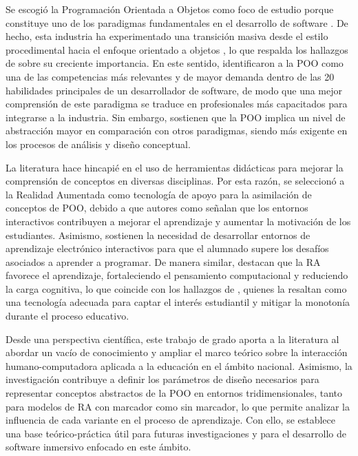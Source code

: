 Se escogió la Programación Orientada a Objetos como foco de estudio porque 
constituye uno de los paradigmas fundamentales en el desarrollo de software 
\parencite{Onu2024}. De hecho, esta industria ha experimentado una transición 
masiva desde el estilo procedimental hacia el enfoque orientado a objetos 
\parencite{Agu2022}, lo que respalda los hallazgos de \textcite{Surakka2007} 
sobre su creciente importancia. En este sentido, \textcite{Cummings2020} 
identificaron a la POO como una de las competencias más relevantes y de 
mayor demanda dentro de las 20 habilidades principales de un desarrollador 
de software, de modo que una mejor comprensión de este paradigma se traduce 
en profesionales más capacitados para integrarse a la industria. Sin embargo, 
\textcite{kar2022} sostienen que la POO implica un nivel de abstracción mayor 
en comparación con otros paradigmas, siendo más exigente en los procesos de 
análisis y diseño conceptual.

La literatura hace hincapié en el uso de herramientas didácticas para mejorar 
la comprensión de conceptos en diversas disciplinas. Por esta razón, se 
seleccionó a la Realidad Aumentada como tecnología de apoyo para la 
asimilación de conceptos de POO, debido a que autores como 
\textcite{Batiha2023} señalan que los entornos interactivos contribuyen a 
mejorar el aprendizaje y aumentar la motivación de los estudiantes. Asimismo, 
\textcite{Rizwan2019} sostienen la necesidad de desarrollar entornos de 
aprendizaje electrónico interactivos para que el alumnado supere los desafíos 
asociados a aprender a programar. De manera similar, \textcite{Hang2023} 
destacan que la RA favorece el aprendizaje, fortaleciendo el pensamiento 
computacional y reduciendo la carga cognitiva, lo que coincide con los 
hallazgos de \textcite{Abidin2020}, quienes la resaltan como una tecnología 
adecuada para captar el interés estudiantil y mitigar la monotonía durante el 
proceso educativo. 

Desde una perspectiva científica, este trabajo de grado aporta a la 
literatura al abordar un vacío de conocimiento y ampliar el marco teórico 
sobre la interacción humano-computadora aplicada a la educación en el ámbito 
nacional. Asimismo, la investigación contribuye a definir los parámetros de 
diseño necesarios para representar conceptos abstractos de la POO en entornos 
tridimensionales, tanto para modelos de RA con marcador como sin marcador, 
lo que permite analizar la influencia de cada variante en el proceso de 
aprendizaje. Con ello, se establece una base teórico-práctica útil para 
futuras investigaciones y para el desarrollo de software inmersivo enfocado 
en este ámbito. 

